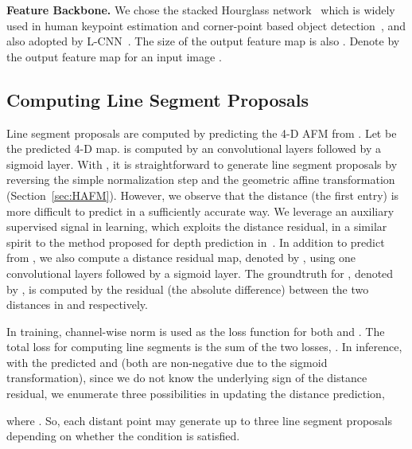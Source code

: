 \documentclass[10pt,twocolumn,letterpaper]{article}
\begin{document}
\textbf{Feature Backbone.} We chose the stacked Hourglass network~\cite{NewellYD16} which is widely used in human keypoint estimation and corner-point based object detection~\cite{CornerNet}, and also adopted by L-CNN~\cite{ZhouQM19}. The size of the output feature map is also . Denote by  the output feature map for an input image .    

\subsection{Computing Line Segment Proposals}\label{sec:lsd}
\vspace{-2mm}
Line segment proposals are computed by predicting the 4-D AFM  from . Let  be the predicted 4-D map.   is computed by 
an 
 convolutional layers followed by a sigmoid layer. With , it is straightforward to generate line segment proposals by reversing the simple normalization step and the geometric affine transformation (Section~\ref{sec:HAFM}). However, we observe that the distance (the first entry) is more difficult to predict in a sufficiently accurate way. We leverage an auxiliary supervised signal in learning, which exploits the distance residual, in a similar spirit to the method proposed for depth prediction in~\cite{ChenHXS19}. In addition to predict  from , we also compute a distance residual map, denoted by , using one  convolutional layers followed by a sigmoid layer. The groundtruth for , denoted by , is computed by the residual (the absolute difference) between the two distances in  and  respectively. 


In training, 
channel-wise  norm
is used as the loss function for both  and . The total loss for computing line segments is the sum of the two losses, . In inference, with the predicted  and  (both are non-negative due to the sigmoid transformation), since we do not know the underlying sign of the distance residual, we enumerate three possibilities in updating the distance prediction, 

where . So, each distant point may generate up to three line segment proposals depending on whether the condition   is satisfied. 
\end{document}

